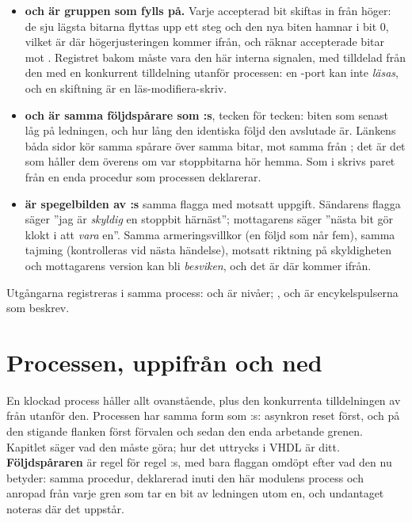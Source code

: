 \begin{itemize}
  \item \textbf{ och  är gruppen som fylls på.} Varje accepterad bit
    skiftas in från höger: de sju lägsta bitarna flyttas upp ett steg och den nya biten hamnar i bit
    0, vilket är där högerjusteringen kommer ifrån, och  räknar accepterade bitar mot
    . Registret bakom  måste vara den här interna signalen, med
     tilldelad från den med en konkurrent tilldelning utanför processen: en
    -port kan inte \emph{läsas}, och en skiftning är en läs-modifiera-skriv.
  \item \textbf{ och  är samma följdspårare som :s},
    tecken för tecken: biten som senast låg på ledningen, och hur lång den identiska följd den
    avslutade är. Länkens båda sidor kör samma spårare över samma bitar, mot samma 
    från ; det är det som håller dem överens om var stoppbitarna hör hemma. Som i
     skrivs paret från en enda procedur som processen deklarerar.
  \item \textbf{ är spegelbilden av :s }
    \textemdash{} samma flagga med motsatt uppgift. Sändarens flagga säger ”jag är \emph{skyldig} en
    stoppbit härnäst”; mottagarens säger ”nästa bit gör klokt i att \emph{vara} en”. Samma
    armeringsvillkor (en följd som når fem), samma tajming (kontrolleras vid nästa händelse), motsatt
    riktning på skyldigheten \textemdash{} och mottagarens version kan bli \emph{besviken}, och det
    är där  kommer ifrån.
\end{itemize}

Utgångarna registreras i samma process:  och  är nivåer; ,
 och  är encykelspulserna som  beskrev.

\section{Processen, uppifrån och ned}
\label{c15:sec:process}

En klockad process håller allt ovanstående, plus den konkurrenta tilldelningen av  från
 utanför den. Processen har samma form som :s: asynkron reset först,
och på den stigande flanken först förvalen och sedan den enda arbetande grenen. Kapitlet säger vad
den måste göra; hur det uttrycks i VHDL är ditt. \textbf{Följdspåraren} är regel för regel
:s, med bara flaggan omdöpt efter vad den nu betyder: samma procedur, deklarerad
inuti den här modulens process och anropad från varje gren som tar en bit av ledningen utom en, och
undantaget noteras där det uppstår.

